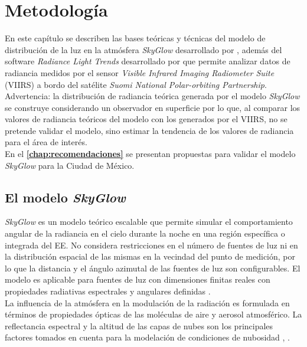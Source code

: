 \chapter{Metodología}
\label{chap:metodologia}

En este capítulo se describen las bases teóricas y técnicas del modelo de distribución de la luz en la atmósfera \textit{SkyGlow} desarrollado por \cite{Kocifaj2007}, además del software \textit{Radiance Light Trends} desarrollado por \cite{RLT2019} que permite analizar datos de radiancia medidos por el sensor \textit{Visible Infrared Imaging Radiometer Suite} (VIIRS) a bordo del satélite \textit{Suomi National Polar-orbiting Partnership}.\\

Advertencia: la distribución de radiancia teórica generada por el modelo \textit{SkyGlow} se construye considerando un observador en superficie por lo que, al comparar los valores de radiancia teóricos del modelo con los generados por el VIIRS, no se pretende validar el modelo, sino estimar la tendencia de los valores de radiancia para el área de interés.\\

En el \textbf{\autoref{chap:recomendaciones}} se presentan propuestas para validar el modelo \textit{SkyGlow} para la Ciudad de México.\\ 

\section{El modelo \textit{SkyGlow}}


\textit{SkyGlow} es un modelo teórico escalable que permite simular el comportamiento angular de la radiancia en el cielo durante la noche en una región específica o integrada del EE. No considera restricciones en el número de fuentes de luz ni en la distribución espacial de las mismas en la vecindad del punto de medición, por lo que la distancia y el ángulo azimutal de las fuentes de luz son configurables. El modelo es aplicable para fuentes de luz con dimensiones finitas reales con propiedades radiativas espectrales y angulares definidas \citep{Kocifaj2007}.\\ 

La influencia de la atmósfera en la modulación de la radiación es formulada en términos de propiedades ópticas de las moléculas de aire y aerosol atmosférico. La reflectancia espectral y la altitud de las capas de nubes son los principales factores tomados en cuenta para la modelación de condiciones de nubosidad \citep{Kocifaj2007}, \citep{Solano2014}.\\ 

